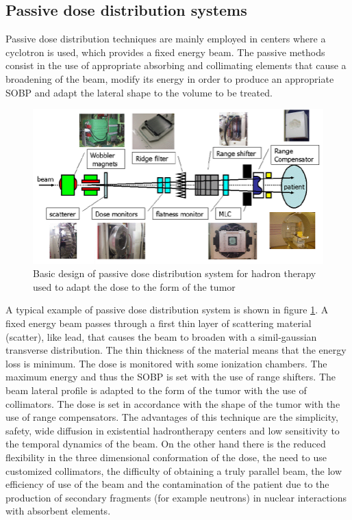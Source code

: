 \subsection{Passive dose distribution systems}
\noindent Passive dose distribution techniques are mainly employed in centers where a cyclotron is used, which provides a fixed energy beam.
The passive methods consist in the use of appropriate absorbing and collimating elements that cause a broadening of the beam, modify its energy in order to produce an appropriate SOBP and adapt the lateral shape to the volume to be treated.
\begin{figure}[H]
	\centering
	\includegraphics[width=0.7\linewidth]{IMG/ch1/Basic-design-of-irradiation-system-for-hadron-therapy}
	\caption{Basic design of passive dose distribution system for hadron therapy used to adapt the dose to the form of the tumor}
	\label{fig:passive}
\end{figure}
\noindent A typical example of passive dose distribution system is shown in figure \ref{fig:passive}. A fixed energy beam passes through a first thin layer of scattering material (scatter), like lead, that causes the beam to broaden with a simil-gaussian transverse distribution.
The thin thickness of the material means that the energy loss is minimum.
The dose is monitored with some ionization chambers.
The maximum energy and thus the SOBP is set with the use of range shifters.
The beam lateral profile is adapted to the form of the tumor with the use of collimators.
The dose is set in accordance with the shape of the tumor with the use of range compensators.
\newline
The advantages of this technique are the simplicity, safety, wide diffusion in existential hadrontherapy centers and low sensitivity to the temporal dynamics of the beam. 
On the other hand there is the reduced flexibility in the three dimensional conformation of the dose, the need to use customized collimators, the difficulty of obtaining a truly parallel beam, the low efficiency of use of the beam and the contamination of the patient due to the production of secondary fragments (for example neutrons) in nuclear interactions with absorbent elements.

